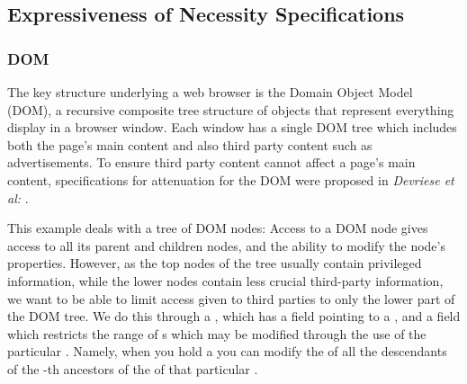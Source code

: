 \subsection{Expressiveness of Necessity Specifications}



\subsubsection{DOM}
\label{ss:DOM}
The key structure underlying a web browser is the Domain Object Model
(DOM), a recursive composite tree structure of objects that represent
everything display in a browser window.  Each window has a single DOM
tree which includes both the page's main content and also third party
content such as advertisements. To ensure third party content cannot
affect a page's main content,
specifications for attenuation for the DOM were proposed in
\textit{Devriese et al:}   \cite{dd}. 

This example deals with a tree of DOM nodes: Access to a DOM node
gives access to all its parent and children nodes, and the ability to
modify the node's properties. However, as the top nodes of the tree
usually contain privileged information, while the lower nodes contain
less crucial third-party information, we want to be able to limit  access given to third parties to only the lower part of the DOM tree. We do this through a , which has a field  pointing to a , and a field  which restricts the range of s which may be modified through the use of the particular . Namely, when you hold a   you can modify the  of all the descendants of the    -th ancestors of the  of that particular . %


